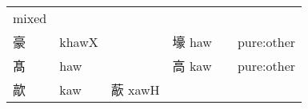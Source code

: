 \documentclass[14pt,a4paper]{scrartcl}
\begin{document}
\begin{longtable}[c]{@{}llllll@{}}
\begin{minipage}[t]{0.14\columnwidth}
mixed
\strut\end{minipage}\tabularnewline
\begin{minipage}[t]{0.14\columnwidth}\raggedright\strut
豪
\strut\end{minipage} &
\begin{minipage}[t]{0.14\columnwidth}\raggedright\strut
khawX
\strut\end{minipage} &
\begin{minipage}[t]{0.14\columnwidth}\raggedright\strut
\strut\end{minipage} &
\begin{minipage}[t]{0.14\columnwidth}\raggedright\strut
壕 haw
\strut\end{minipage} &
\begin{minipage}[t]{0.14\columnwidth}\raggedright\strut
\strut\end{minipage} &
\begin{minipage}[t]{0.14\columnwidth}\raggedright\strut
pure:other
\strut\end{minipage}\tabularnewline
\begin{minipage}[t]{0.14\columnwidth}\raggedright\strut
髙
\strut\end{minipage} &
\begin{minipage}[t]{0.14\columnwidth}\raggedright\strut
haw
\strut\end{minipage} &
\begin{minipage}[t]{0.14\columnwidth}\raggedright\strut
\strut\end{minipage} &
\begin{minipage}[t]{0.14\columnwidth}\raggedright\strut
高 kaw
\strut\end{minipage} &
\begin{minipage}[t]{0.14\columnwidth}\raggedright\strut
\strut\end{minipage} &
\begin{minipage}[t]{0.14\columnwidth}\raggedright\strut
pure:other
\strut\end{minipage}\tabularnewline
\begin{minipage}[t]{0.14\columnwidth}\raggedright\strut
歊
\strut\end{minipage} &
\begin{minipage}[t]{0.14\columnwidth}\raggedright\strut
kaw
\strut\end{minipage} &
\begin{minipage}[t]{0.14\columnwidth}\raggedright\strut
藃 xawH
\strut\end{minipage} &
\begin{minipage}[t]{0.14\columnwidth}\raggedright\strut

\end{minipage}
\end{longtable}
\end{document}

